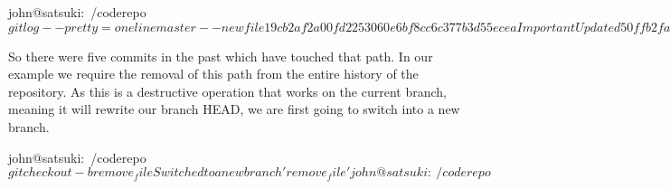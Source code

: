 \begin{code}
john@satsuki:~/coderepo$ git log --pretty=oneline master -- newfile1
9cb2af2a00fd2253060e6bf8cc6c377b3d55ecea Important Update
d50ffb2fa536d869f2c4e89e8d6a48e0a29c5cc1 Merged in zaney
a27d49ef11d9f0e66edbad8f6c7806510ad5b2be Made an awesome change
cfbecabb031696a217b77b0e1285f2d5fc2ea2a3 Fantastic new feature
55fb69f4ad26fdb6b90ac6f43431be40779962dd Added two new files
john@satsuki:~/coderepo$
\end{code}

So there were five commits in the past which have touched that path.
In our example we require the removal of this path from the entire history of the repository.
As this is a destructive operation that works on the current branch, meaning it will rewrite our branch HEAD, we are first going to switch into a new branch.

\begin{code}
john@satsuki:~/coderepo$ git checkout -b remove_file
Switched to a new branch 'remove_file'
john@satsuki:~/coderepo$ 
\end{code}

